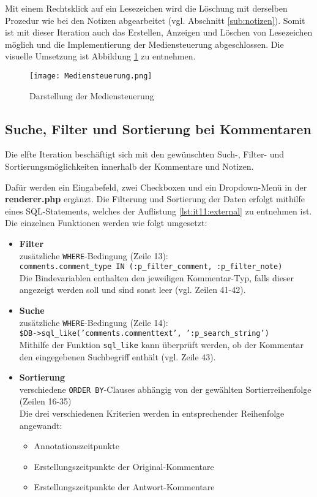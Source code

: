 Mit einem Rechtsklick auf ein Lesezeichen wird die Löschung mit derselben Prozedur wie bei den Notizen abgearbeitet (vgl. Abschnitt \ref{sub:notizen}). Somit ist mit dieser Iteration auch das Erstellen, Anzeigen und Löschen von Lesezeichen möglich und die Implementierung der Mediensteuerung abgeschlossen. Die visuelle Umsetzung ist Abbildung \ref{fig:Mediensteuerung} zu entnehmen.


\begin{figure}[h!]
\texttt{[image: Mediensteuerung.png]}
\caption{\label{fig:Mediensteuerung}Darstellung der Mediensteuerung}
\end{figure}


\subsection{Suche, Filter und Sortierung bei Kommentaren}
Die elfte Iteration beschäftigt sich mit den gewünschten Such-, Filter- und Sortierungsmöglichkeiten innerhalb der Kommentare und Notizen.

Dafür werden ein Eingabefeld, zwei Checkboxen und ein Dropdown-Menü in der \textbf{renderer.php} ergänzt. Die Filterung und Sortierung der Daten erfolgt mithilfe eines SQL-Statements, welches der Auflistung \ref{lst:it11:external} zu entnehmen ist. Die einzelnen Funktionen werden wie folgt umgesetzt:

\begin{itemize}
\item \textbf{Filter}\\
zusätzliche \texttt{WHERE}-Bedingung (Zeile 13):\\
\texttt{comments.comment_type IN (:p_filter_comment, :p_filter_note)}\\
Die Bindevariablen enthalten den jeweiligen Kommentar-Typ, falls dieser angezeigt werden soll und sind sonst leer (vgl. Zeilen 41-42).
\item \textbf{Suche}\\
zusätzliche \texttt{WHERE}-Bedingung (Zeile 14):\\
\texttt{\$DB->sql_like('comments.commenttext', ':p_search_string')}\\
Mithilfe der Funktion \texttt{sql_like} kann überprüft werden, ob der Kommentar den eingegebenen Suchbegriff enthält (vgl. Zeile 43).
\item \textbf{Sortierung}\\
verschiedene \texttt{ORDER BY}-Clauses abhängig von der gewählten Sortierreihenfolge (Zeilen 16-35)\\
Die drei verschiedenen Kriterien werden in entsprechender Reihenfolge angewandt:
\begin{itemize}
\item Annotationszeitpunkte
\item Erstellungszeitpunkte der Original-Kommentare
\item Erstellungszeitpunkte der Antwort-Kommentare
\end{itemize}
\end{itemize}

